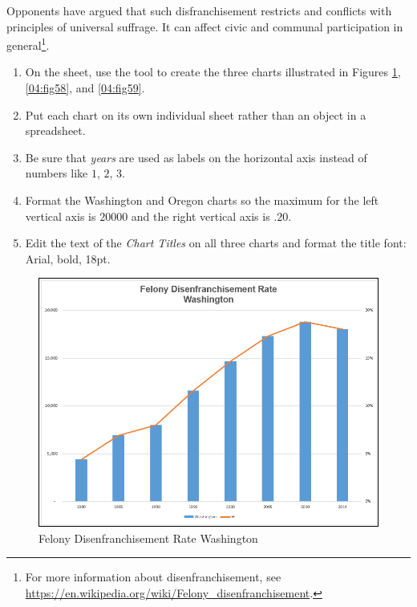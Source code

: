 Opponents have argued that such disfranchisement restricts and conflicts with principles of universal suffrage. It can affect civic and communal participation in general\footnote{For more information about disenfranchisement, see \url{https://en.wikipedia.org/wiki/Felony_disenfranchisement}.}.

\begin{enumerate}
	\item On the  sheet, use the  tool to create the three charts illustrated in Figures \ref{04:fig57}, \ref{04:fig58}, and \ref{04:fig59}. 
	\item Put each chart on its own individual sheet rather than an object in a spreadsheet.
	\item Be sure that \textit{years} are used as labels on the horizontal axis instead of numbers like $ 1 $, $ 2 $, $ 3 $. 
	\item Format the Washington and Oregon charts so the maximum for the left vertical axis is $ 20000 $ and the right vertical axis is $ .20 $. 
	\item Edit the text of the \textit{Chart Titles} on all three charts and format the title font: Arial, bold, 18pt.
\end{enumerate}

\begin{figure}[H]
	\centering
	\includegraphics[width=\maxwidth{.95\linewidth}]{gfx/ch04_fig57}
	\caption{Felony Disenfranchisement Rate Washington}
	\label{04:fig57}
\end{figure}


